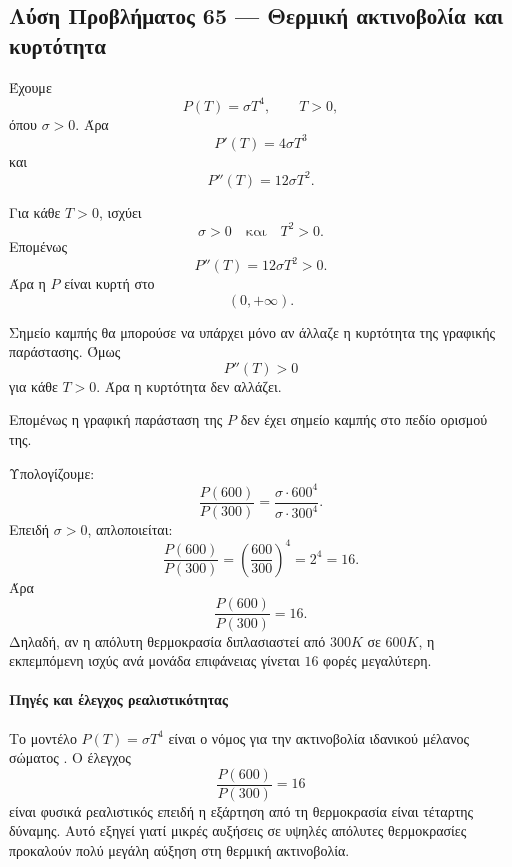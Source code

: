 \subsection*{Λύση Προβλήματος 65 --- Θερμική ακτινοβολία και κυρτότητα}

\begin{alist}
  \item Έχουμε
        \[
          P(T)=\sigma T^4,
          \qquad T>0,
        \]
        όπου \(\sigma>0\). Άρα
        \[
          {P'(T)=4\sigma T^3}
        \]
        και
        \[
          {P''(T)=12\sigma T^2}.
        \]

  \item Για κάθε \(T>0\), ισχύει
        \[
          \sigma>0
          \quad\text{και}\quad
          T^2>0.
        \]
        Επομένως
        \[
          P''(T)=12\sigma T^2>0.
        \]
        Άρα η \(P\) είναι κυρτή στο
        \[
          {(0,+\infty)}.
        \]

  \item Σημείο καμπής θα μπορούσε να υπάρχει μόνο αν άλλαζε η κυρτότητα
        της γραφικής παράστασης. Όμως
        \[
          P''(T)>0
        \]
        για κάθε \(T>0\). Άρα η κυρτότητα δεν αλλάζει.

        Επομένως η γραφική παράσταση της \(P\) δεν έχει σημείο καμπής
        στο πεδίο ορισμού της.

  \item Υπολογίζουμε:
        \[
          \frac{P(600)}{P(300)}
          =
          \frac{\sigma\cdot600^4}{\sigma\cdot300^4}.
        \]
        Επειδή \(\sigma>0\), απλοποιείται:
        \[
          \frac{P(600)}{P(300)}
          =
          \left(\frac{600}{300}\right)^4
          =
          2^4
          =
          16.
        \]
        Άρα
        \[
          {\frac{P(600)}{P(300)}=16}.
        \]
        Δηλαδή, αν η απόλυτη θερμοκρασία διπλασιαστεί από \(300\si{K}\)
        σε \(600\si{K}\), η εκπεμπόμενη ισχύς ανά μονάδα επιφάνειας
        γίνεται \(16\) φορές μεγαλύτερη.
\end{alist}

\paragraph{Πηγές και έλεγχος ρεαλιστικότητας}
Το μοντέλο \(P(T)=\sigma T^4\) είναι ο νόμος
 για την ακτινοβολία ιδανικού μέλανος σώματος
\cite{openstaxCollegePhysicsRadiation}. Ο έλεγχος
\[
  \frac{P(600)}{P(300)}=16
\]
είναι φυσικά ρεαλιστικός επειδή η εξάρτηση από τη θερμοκρασία είναι
τέταρτης δύναμης. Αυτό εξηγεί γιατί μικρές αυξήσεις σε υψηλές απόλυτες
θερμοκρασίες προκαλούν πολύ μεγάλη αύξηση στη θερμική ακτινοβολία.
